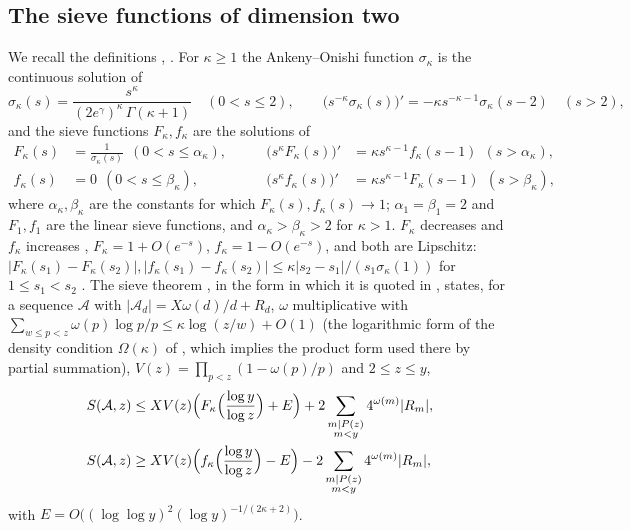 ﻿\documentclass[11pt]{amsart}
\theoremstyle{remark}
\newcommand{\cA}{\mathcal{A}}
\begin{document}
\subsection{The sieve functions of dimension two}\label{subsec:F2}
We recall the definitions \cite{DHR}, \cite[Chapters~6 and 9]{DH}. For $\kappa\ge1$ the Ankeny--Onishi function $\sigma_\kappa$ is the continuous solution of
\[
\sigma_\kappa(s)=\frac{s^\kappa}{(2e^\gamma)^\kappa\,\Gamma(\kappa+1)}\quad(0<s\le2),\qquad \bigl(s^{-\kappa}\sigma_\kappa(s)\bigr)'=-\kappa s^{-\kappa-1}\sigma_\kappa(s-2)\quad(s>2),
\]
and the sieve functions $F_\kappa,f_\kappa$ are the solutions of
\begin{equation}\label{eq:dde}
\begin{aligned}
F_\kappa(s)&=\frac1{\sigma_\kappa(s)}\ \ (0<s\le\alpha_\kappa), &\qquad \bigl(s^\kappa F_\kappa(s)\bigr)'&=\kappa s^{\kappa-1}f_\kappa(s-1)\ \ (s>\alpha_\kappa),\\
f_\kappa(s)&=0\ \ (0<s\le\beta_\kappa), &\qquad \bigl(s^\kappa f_\kappa(s)\bigr)'&=\kappa s^{\kappa-1}F_\kappa(s-1)\ \ (s>\beta_\kappa),
\end{aligned}
\end{equation}
where $\alpha_\kappa,\beta_\kappa$ are the constants for which $F_\kappa(s),f_\kappa(s)\to1$; $\alpha_1=\beta_1=2$ and $F_1,f_1$ are the linear sieve functions, and $\alpha_\kappa>\beta_\kappa>2$ for $\kappa>1$. $F_\kappa$ decreases and $f_\kappa$ increases \cite[Chapter~6]{DH}, $F_\kappa=1+O(e^{-s})$, $f_\kappa=1-O(e^{-s})$, and both are Lipschitz: $|F_\kappa(s_1)-F_\kappa(s_2)|,|f_\kappa(s_1)-f_\kappa(s_2)|\le\kappa|s_2-s_1|/(s_1\sigma_\kappa(1))$ for $1\le s_1<s_2$ \cite[Lemma~6.2]{DH}. The sieve theorem \cite[Theorem~9.1]{DH}, in the form in which it is quoted in \cite[Section~4]{FK}, states, for a sequence $\cA$ with $|\cA_d|=X\omega(d)/d+R_d$, $\omega$ multiplicative with $\sum_{w\le p<z}\omega(p)\log p/p\le\kappa\log(z/w)+O(1)$ (the logarithmic form of the density condition $\Omega(\kappa)$ of \cite{DH}, which implies the product form used there by partial summation), $V(z)=\prod_{p<z}(1-\omega(p)/p)$ and $2\le z\le y$,
\begin{equation}\label{eq:dhr}
\begin{aligned}
S(\cA,z)&\le XV(z)\Bigl(F_\kappa\Bigl(\frac{\log y}{\log z}\Bigr)+E\Bigr)+2\sum_{\substack{m\mid P(z)\\ m<y}}4^{\omega(m)}|R_m|,\\
S(\cA,z)&\ge XV(z)\Bigl(f_\kappa\Bigl(\frac{\log y}{\log z}\Bigr)-E\Bigr)-2\sum_{\substack{m\mid P(z)\\ m<y}}4^{\omega(m)}|R_m|,
\end{aligned}
\end{equation}
with $E=O\bigl((\log\log y)^2(\log y)^{-1/(2\kappa+2)}\bigr)$.
\end{document}
